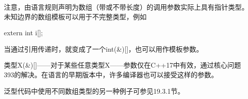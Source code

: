 注意，由语言规则声明为数组（带或不带长度）的调用参数实际上具有指针类型。未知边界的数组模板可以用于不完整类型，例如

\begin{cpp}
extern int i[];
\end{cpp}

当通过引用传递时，就变成了一个int(\&)[]，也可以用作模板参数。

\begin{notice}
类型X(\&)[]——对于某些任意类型X——参数仅在C++17中有效，通过核心问题393的解决。在语言的早期版本中，许多编译器也可以接受这样的参数。
\end{notice}

泛型代码中使用不同数组类型的另一种例子可参见19.3.1节。

















